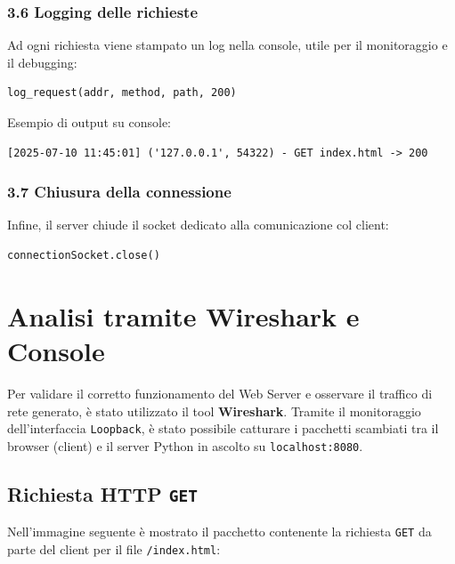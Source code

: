 \documentclass[a4paper,12pt]{report}
\begin{document}
\subsection*{3.6 Logging delle richieste}

Ad ogni richiesta viene stampato un log nella console, utile per il monitoraggio e il debugging:

\begin{verbatim}
log_request(addr, method, path, 200)
\end{verbatim}

Esempio di output su console:

\begin{verbatim}
[2025-07-10 11:45:01] ('127.0.0.1', 54322) - GET index.html -> 200
\end{verbatim}



\subsection*{3.7 Chiusura della connessione}

Infine, il server chiude il socket dedicato alla comunicazione col client:

\begin{verbatim}
connectionSocket.close()
\end{verbatim}


\chapter{Analisi tramite Wireshark e Console}

Per validare il corretto funzionamento del Web Server e osservare il traffico di rete generato, è stato utilizzato il tool \textbf{Wireshark}. Tramite il monitoraggio dell’interfaccia \texttt{Loopback}, è stato possibile catturare i pacchetti scambiati tra il browser (client) e il server Python in ascolto su \texttt{localhost:8080}.

\section{Richiesta HTTP \texttt{GET}}

Nell’immagine seguente è mostrato il pacchetto contenente la richiesta \texttt{GET} da parte del client per il file \texttt{/index.html}:
\end{document}
